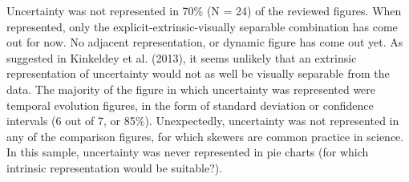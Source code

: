 \documentclass[12pt,a4paper,draft]{article}
\begin{document}
Uncertainty was not represented in 70\% (N = 24) of the reviewed figures.
When represented, only the explicit-extrinsic-visually separable combination has come out for now.
No adjacent representation, or dynamic figure has come out yet.
As suggested in Kinkeldey et al. (2013), it seems unlikely that an extrinsic representation of uncertainty would not as well be visually separable from the data.
The majority of the figure in which uncertainty was represented were temporal evolution figures, in the form of standard deviation or confidence intervals (6 out of 7, or 85\%).
Unexpectedly, uncertainty was not represented in any of the comparison figures, for which skewers are common practice in science.
In this sample, uncertainty was never represented in pie charts (for which intrinsic representation would be suitable?).
\end{document}
